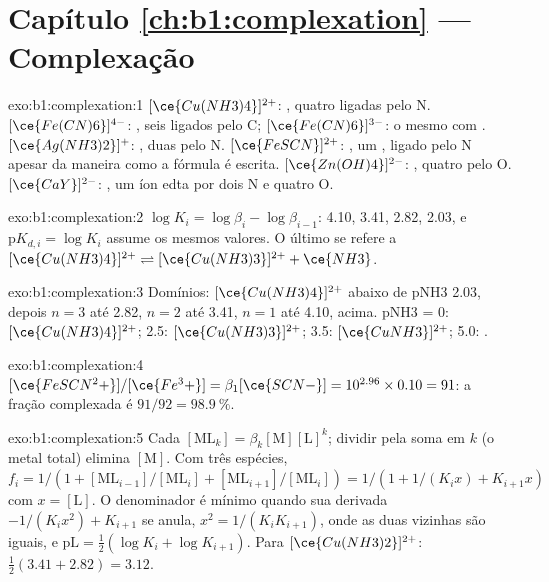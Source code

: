 \section*{Capítulo \ref{ch:b1:complexation} --- Complexação}

\begin{solution}{exo:b1:complexation:1}
$[\ce{Cu(NH3)4}]^{2+}$: , quatro  ligadas pelo N.
$[\ce{Fe(CN)6}]^{4-}$: , seis  ligados pelo C;
$[\ce{Fe(CN)6}]^{3-}$: o mesmo com . $[\ce{Ag(NH3)2}]^{+}$:
, duas  pelo N. $[\ce{FeSCN}]^{2+}$: , um
, ligado pelo N apesar da maneira como a fórmula é escrita.
$[\ce{Zn(OH)4}]^{2-}$: , quatro  pelo O.
$[\ce{CaY}]^{2-}$: , um íon edta por dois N e quatro O.
\end{solution}

\begin{solution}{exo:b1:complexation:2}
$\log K_i = \log\beta_i - \log\beta_{i-1}$: 4.10, 3.41, 2.82, 2.03, e
$\mathrm{p}K_{d,i} = \log K_i$ assume os mesmos valores. O último se refere a
$[\ce{Cu(NH3)4}]^{2+} \rightleftharpoons [\ce{Cu(NH3)3}]^{2+} + \ce{NH3}$.
\end{solution}

\begin{solution}{exo:b1:complexation:3}
Domínios: $[\ce{Cu(NH3)4}]^{2+}$ abaixo de pNH3 2.03, depois $n = 3$ até 2.82,
$n = 2$ até 3.41, $n = 1$ até 4.10,  acima. pNH3 = 0:
$[\ce{Cu(NH3)4}]^{2+}$; 2.5: $[\ce{Cu(NH3)3}]^{2+}$; 3.5:
$[\ce{CuNH3}]^{2+}$; 5.0: .
\end{solution}

\begin{solution}{exo:b1:complexation:4}
$[\ce{FeSCN^2+}]/[\ce{Fe^3+}] = \beta_1[\ce{SCN-}] = 10^{2.96} \times 0.10 =
91$: a fração complexada é $91/92 = \qty{98.9}{\percent}$.
\end{solution}

\begin{solution}{exo:b1:complexation:5}
Cada $[\mathrm{ML}_k] = \beta_k[\mathrm{M}][\mathrm{L}]^k$; dividir pela
soma em $k$ (o metal total) elimina $[\mathrm{M}]$. Com três espécies,
$f_i = 1/(1 + [\mathrm{ML}_{i-1}]/[\mathrm{ML}_i] +
[\mathrm{ML}_{i+1}]/[\mathrm{ML}_i]) = 1/(1 + 1/(K_i x) + K_{i+1}x)$ com
$x = [\mathrm{L}]$. O denominador é mínimo quando sua derivada
$-1/(K_i x^2) + K_{i+1}$ se anula, $x^2 = 1/(K_iK_{i+1})$, onde as duas
vizinhas são iguais, e $\mathrm{pL} = \frac12(\log K_i + \log K_{i+1})$.
Para $[\ce{Cu(NH3)2}]^{2+}$: $\frac12(3.41 + 2.82) = 3.12$.
\end{solution}

